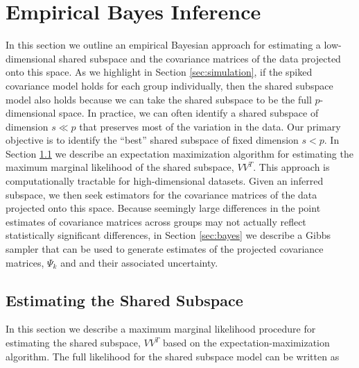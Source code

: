 \documentclass[12pt]{article}
\begin{document}
\section{Empirical Bayes Inference}
\label{sec:inference}

In this section we outline an empirical Bayesian approach for
estimating a low-dimensional shared subspace and the covariance
matrices of the data projected onto this space. As we highlight in
Section \ref{sec:simulation}, if the spiked covariance model holds for
each group individually, then the shared subspace model also
holds because we can take the shared subspace to be the full
$p$-dimensional space. In practice, we can often identify a shared
subspace of dimension $s \ll p$ that preserves most of the variation
in the data.  Our primary objective is to identify the ``best'' shared
subspace of fixed dimension $s < p$.  In Section \ref{sec:em} we
describe an expectation maximization algorithm for estimating the
maximum marginal likelihood of the shared subspace, $VV^T$.  This
approach is computationally tractable for high-dimensional datasets.
Given an inferred subspace, we then seek estimators for the covariance
matrices of the data projected onto this space.  Because seemingly
large differences in the point estimates of covariance matrices across
groups may not actually reflect statistically significant differences,
in Section \ref{sec:bayes} we describe a Gibbs sampler that can be
used to generate estimates of the projected covariance matrices,
$\Psi_k$ and and their associated uncertainty.





\subsection{Estimating the  Shared Subspace}
\label{sec:em}

In this section we describe a maximum marginal likelihood procedure for
estimating the shared subspace, $VV^T$ based on the
expectation-maximization algorithm.  The full likelihood
for the shared subspace model can be written as
\end{document}
